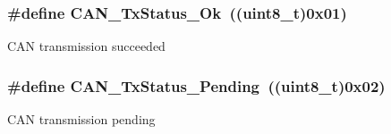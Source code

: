 \subsubsection[{C\+A\+N\+\_\+\+Tx\+Status\+\_\+\+Ok}]{\setlength{\rightskip}{0pt plus 5cm}\#define C\+A\+N\+\_\+\+Tx\+Status\+\_\+\+Ok~((uint8\+\_\+t)0x01)}\label{group___c_a_n__transmit__constants_ga0b401c61922b1449de9b486dcf475c97}
C\+A\+N transmission succeeded \hypertarget{group___c_a_n__transmit__constants_ga9678a3a51379422868083608c7394409}{}
\subsubsection[{C\+A\+N\+\_\+\+Tx\+Status\+\_\+\+Pending}]{\setlength{\rightskip}{0pt plus 5cm}\#define C\+A\+N\+\_\+\+Tx\+Status\+\_\+\+Pending~((uint8\+\_\+t)0x02)}\label{group___c_a_n__transmit__constants_ga9678a3a51379422868083608c7394409}
C\+A\+N transmission pending 